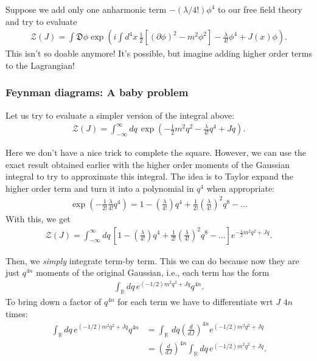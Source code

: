 \documentclass{book}
\theoremstyle{definition}
\newcommand{\p}{\partial}
\newcommand{\f}[2]{\frac{#1}{#2}}
\newcommand{\lp}{\left(}
\newcommand{\rp}{\right)}
\newcommand{\lb}{\left[}
\newcommand{\rb}{\right]}
\newcommand{\Z}{\mathcal{Z}}
\begin{document}
Suppose we add only one anharmonic term $-(\lambda / 4!)\phi^4$ to our free field theory and try to evaluate
\begin{align}
\Z(J) = \int \mathfrak{D}\phi \exp\lp i\int d^4x\,  \f{1}{2}\lb(\p \phi)^2 - m^2 \phi^2 \rb - \f{\lambda}{4!}\phi^4 + J(x)\phi \rp.
\end{align}
This isn't so doable anymore! It's possible, but imagine adding higher order terms to the Lagrangian! 











\subsubsection{Feynman diagrams: A baby problem}

Let us try to evaluate a simpler version of the integral above:
\begin{align}
\Z(J) = \int^\infty_{-\infty} dq\, \exp\lp -\f{1}{2}m^2 q^2 - \f{\lambda}{4!}q^4 + Jq \rp.
\end{align}

Here we don't have a nice trick to complete the square. However, we can use the exact result obtained earlier with the higher order moments of the Gaussian integral to try to approximate this integral. The idea is to Taylor expand the higher order term and turn it into a polynomial in $q^4$ when appropriate:
\begin{align}
\exp\lp -\f{1}{2!}\f{\lambda}{4!}q^4 \rp = 1 - \lp\f{\lambda}{4!}\rp q^4 + \f{1}{2!}\lp\f{\lambda}{4!}\rp^2 q^8 - \dots
\end{align}
With this, we get
\begin{align}
\Z(J) = \int^\infty_{-\infty} dq\,  \lb 1 - \lp\f{\lambda}{4!}\rp q^4 + \f{1}{2!}\lp\f{\lambda}{4!}\rp^2 q^8 - \dots \rb e^{ -\f{1}{2}m^2 q^2 + Jq }.
\end{align}

Then, we \textit{simply} integrate term-by term. This we can do because now they are just $q^{4n}$ moments of the original Gaussian, i.e., each term has the form
\begin{align}
\int_\mathbb{R} dq\, e^{(-1/2)m^2 q^2 + Jq}q^{4n}.
\end{align}
To bring down a factor of $q^{4n}$ for each term we have to differentiate wrt $J$ $4n$ times:
\begin{align}
\int_\mathbb{R} dq\, e^{(-1/2)m^2 q^2 + Jq}q^{4n} &= \int_\mathbb{R}\,dq \lp \f{d}{dJ} \rp^{4n} e^{(-1/2)m^2 q^2 + Jq} \\
&=   \lp \f{d}{dJ} \rp^{4n} \int_\mathbb{R}dq \, e^{(-1/2)m^2 q^2 + Jq}.
\end{align}
\end{document}
